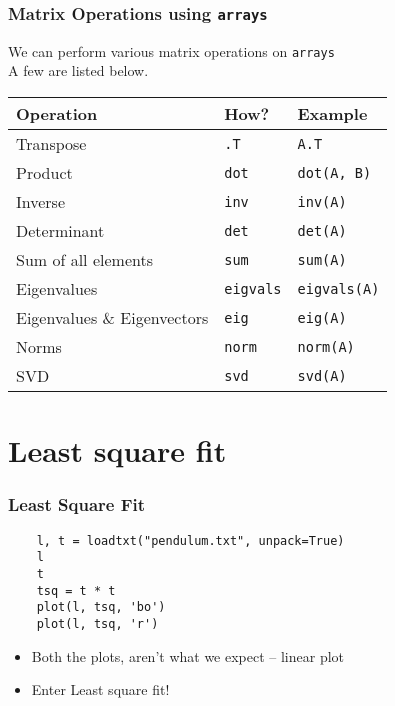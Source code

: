 \begin{frame}[fragile]
  \frametitle{Matrix Operations using \texttt{arrays}}
  We can perform various matrix operations on \texttt{arrays}\\ 
  A few are listed below.

  \begin{center}
    \begin{tabular}{lll}
      Operation                    &  How?           &  Example           \\
      \hline
      Transpose                    &  \texttt{.T}       &  \texttt{A.T}         \\
      Product                      &  \texttt{dot}      &  \texttt{dot(A, B)}   \\
      Inverse                      &  \texttt{inv}      &  \texttt{inv(A)}      \\
      Determinant                  &  \texttt{det}      &  \texttt{det(A)}      \\
      Sum of all elements          &  \texttt{sum}      &  \texttt{sum(A)}      \\
      Eigenvalues                  &  \texttt{eigvals}  &  \texttt{eigvals(A)}  \\
      Eigenvalues \& Eigenvectors  &  \texttt{eig}      &  \texttt{eig(A)}      \\
      Norms                        &  \texttt{norm}     &  \texttt{norm(A)}     \\
      SVD                          &  \texttt{svd}      &  \texttt{svd(A)}      \\
    \end{tabular}
  \end{center}
\end{frame}

\section{Least square fit}

\begin{frame}[fragile]
  \frametitle{Least Square Fit}
  \begin{lstlisting}
    l, t = loadtxt("pendulum.txt", unpack=True)
    l
    t
    tsq = t * t
    plot(l, tsq, 'bo')
    plot(l, tsq, 'r')
  \end{lstlisting}
  \begin{itemize}
  \item Both the plots, aren't what we expect -- linear plot
  \item Enter Least square fit!
  \end{itemize}
\end{frame}


